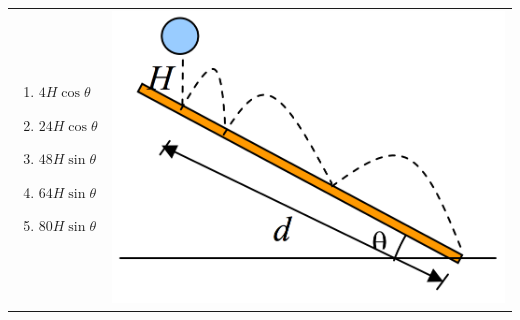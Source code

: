 \documentclass[12pt,letterpaper]{article}
\begin{document}
\begin{enumerate}[resume]
\begin{tabular}{l r}
\begin{minipage}{0.6\textwidth}
\begin{enumerate}
\item $4H\cos\theta$
\item $24H\cos\theta$
\item $48H\sin\theta$
\item $64H\sin\theta$
\item $80H\sin\theta$
\end{enumerate}
\end{minipage} &
\begin{minipage}{0.3\textwidth}
\includegraphics[width=\textwidth,left]{bounce.png}
\end{minipage}
\end{tabular}

\end{enumerate}
\end{document}
